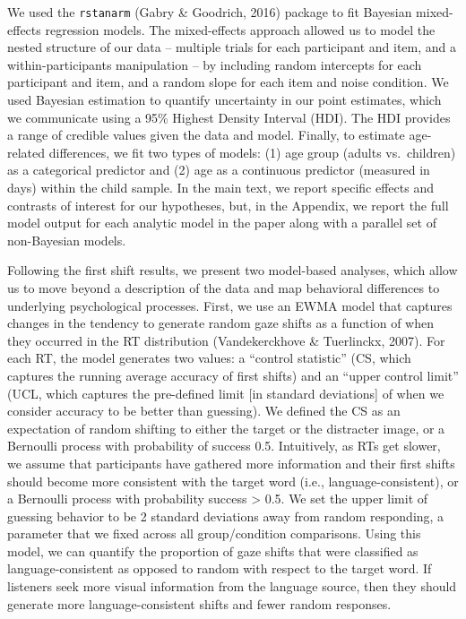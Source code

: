 \documentclass[,man,floatsintext]{apa6}
\begin{document}
We used the \texttt{rstanarm} (Gabry \& Goodrich, 2016) package to fit Bayesian mixed-effects regression models. The mixed-effects approach allowed us to model the nested structure of our data -- multiple trials for each participant and item, and a within-participants manipulation -- by including random intercepts for each participant and item, and a random slope for each item and noise condition. We used Bayesian estimation to quantify uncertainty in our point estimates, which we communicate using a 95\% Highest Density Interval (HDI). The HDI provides a range of credible values given the data and model. Finally, to estimate age-related differences, we fit two types of models: (1) age group (adults vs.~children) as a categorical predictor and (2) age as a continuous predictor (measured in days) within the child sample. In the main text, we report specific effects and contrasts of interest for our hypotheses, but, in the Appendix, we report the full model output for each analytic model in the paper along with a parallel set of non-Bayesian models.

Following the first shift results, we present two model-based analyses, which allow us to move beyond a description of the data and map behavioral differences to underlying psychological processes. First, we use an EWMA model that captures changes in the tendency to generate random gaze shifts as a function of when they occurred in the RT distribution (Vandekerckhove \& Tuerlinckx, 2007). For each RT, the model generates two values: a \enquote{control statistic} (CS, which captures the running average accuracy of first shifts) and an \enquote{upper control limit} (UCL, which captures the pre-defined limit {[}in standard deviations{]} of when we consider accuracy to be better than guessing). We defined the CS as an expectation of random shifting to either the target or the distracter image, or a Bernoulli process with probability of success 0.5. Intuitively, as RTs get slower, we assume that participants have gathered more information and their first shifts should become more consistent with the target word (i.e., language-consistent), or a Bernoulli process with probability success \textgreater{} 0.5. We set the upper limit of guessing behavior to be 2 standard deviations away from random responding, a parameter that we fixed across all group/condition comparisons. Using this model, we can quantify the proportion of gaze shifts that were classified as language-consistent as opposed to random with respect to the target word. If listeners seek more visual information from the language source, then they should generate more language-consistent shifts and fewer random responses.
\end{document}
